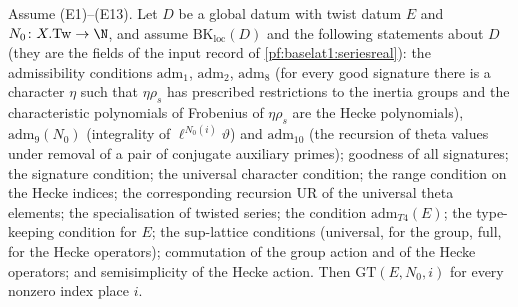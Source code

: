 \begin{theorem}\label{pf:baselat1:twistthm}
Assume (E1)--(E13). Let $D$ be a global datum with twist datum $E$ and $N_0\colon X.\mathrm{Tw}\to\N$, and assume
$\mathrm{BK}_{\mathrm{loc}}(D)$ and the following statements about $D$ (they are the fields of the input record of
\cref{pf:baselat1:seriesreal}): the admissibility conditions $\mathrm{adm}_1$, $\mathrm{adm}_2$, $\mathrm{adm}_8$
(for every good signature there is a character $\eta$ such that $\eta\rho_s$ has prescribed restrictions to the
inertia groups and the characteristic polynomials of Frobenius of $\eta\rho_s$ are the Hecke polynomials),
$\mathrm{adm}_9(N_0)$ (integrality of $\ell^{N_0(i)}\vartheta$) and $\mathrm{adm}_{10}$ (the recursion of theta values
under removal of a pair of conjugate auxiliary primes); goodness of all signatures; the signature condition; the
universal character condition; the range condition on the Hecke indices; the corresponding recursion $\mathrm{UR}$ of
the universal theta elements; the specialisation of twisted series; the condition $\mathrm{adm}_{T4}(E)$; the
type-keeping condition for $E$; the sup-lattice conditions (universal, for the group, full, for the Hecke operators);
commutation of the group action and of the Hecke operators; and semisimplicity of the Hecke action. Then
$\mathrm{GT}(E,N_0,i)$ for every nonzero index place $i$.
\end{theorem}

